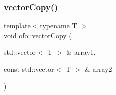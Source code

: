 \mbox{\label{namespaceofo_a172e86f4c58be11de0b77ba5bb670638}} 
\subsubsection{\texorpdfstring{vector\+Copy()}{vectorCopy()}}
{\footnotesize\ttfamily template$<$typename T $>$ \\
void ofo\+::vector\+Copy (\begin{DoxyParamCaption}\item[{std\+::vector$<$ T $>$ \&}]{array1,  }\item[{const std\+::vector$<$ T $>$ \&}]{array2 }\end{DoxyParamCaption})}


